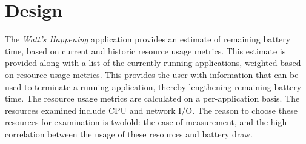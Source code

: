 \section{Design}
\label{sec:design}
% 


The \emph{Watt's Happening} application provides an estimate of remaining battery time, based on current and historic resource usage metrics. 
This estimate is provided along with a list of the currently running applications, weighted based on resource usage metrics.  
This provides the user with information that can be used to terminate a running application, thereby lengthening remaining battery time.
The resource usage metrics are calculated on a per-application basis.
The resources examined include CPU and network I/O.
The reason to choose these resources for examination is twofold: the ease of measurement, and the high correlation between the usage of these resources and battery draw.

